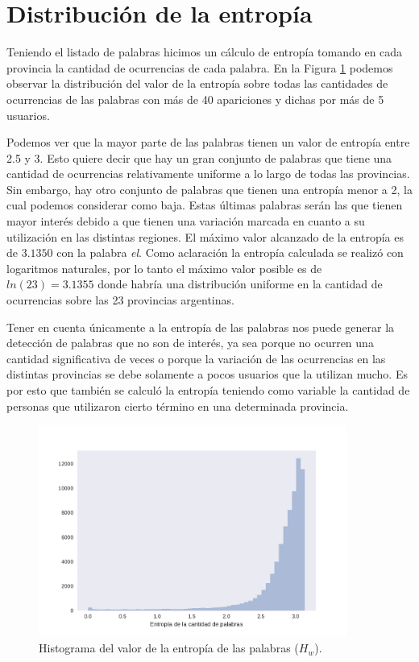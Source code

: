 \section{Distribución de la entropía}
Teniendo el listado de palabras hicimos un cálculo de entropía tomando en cada provincia la cantidad de ocurrencias de cada palabra. En la Figura \ref{fig:entropiaPalabras} podemos observar la distribución del valor de la entropía sobre todas las cantidades de ocurrencias de las palabras con más de 40 apariciones y dichas por más de 5 usuarios. 

Podemos ver que la mayor parte de las palabras tienen un valor de entropía entre 2.5 y 3. Esto quiere decir que hay un gran conjunto de palabras que tiene una cantidad de ocurrencias relativamente uniforme a lo largo de todas las provincias. Sin embargo, hay otro conjunto de palabras que tienen una entropía menor a 2, la cual podemos considerar como baja. Estas últimas palabras serán las que tienen mayor interés debido a que tienen una variación marcada en cuanto a su utilización en las distintas regiones. El máximo valor alcanzado de la entropía es de $3.1350$ con la palabra \textit{el}. Como aclaración la entropía calculada se realizó con logaritmos naturales, por lo tanto el máximo valor posible es de  $ln(23) = 3.1355$ donde habría una distribución uniforme en la cantidad de ocurrencias sobre las 23 provincias argentinas.

Tener en cuenta únicamente a la entropía de las palabras nos puede generar la detección de palabras que no son de interés, ya sea porque no ocurren una cantidad significativa de veces o porque la variación de las ocurrencias en las distintas provincias se debe solamente a pocos usuarios que la utilizan mucho. Es por esto que también se calculó la entropía teniendo como variable la cantidad de personas que utilizaron cierto término en una determinada provincia.


\begin{figure}[ht]
\centering
\includegraphics[width=0.9\textwidth]{./images/DistribucionEntropia.pdf}
\caption{Histograma del valor de la entropía de las palabras ($H_w$).} 
\label{fig:entropiaPalabras} 
\end{figure}

